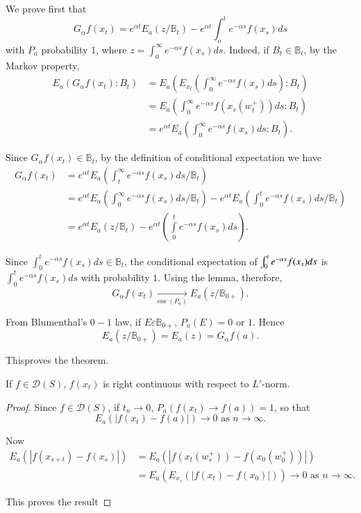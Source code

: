 \begin{pot2}%
We prove first that
$$
G_\alpha f (x_t) = e^{\alpha t} E_a (z /\mathbb{B}_t) -e^{\alpha t}
\int^t_o e^{- \alpha s} f (x_s) ds 
$$
with $P_a$ probability 1, where $z = \int^\infty_0 e^{-\alpha s} f
  (x_s) ds$. Indeed, if $B_t \in \mathbb{B}_t$, by the Markov
  property, 
\begin{align*}
E_a (G_\alpha f (x_t):B_t) & = E_a \left(E_{x_t} \left(\int^\infty_0
e^{-\alpha s} f (x_s) ds\right):B_t\right)\\ 
& = E_a \left(\int^\infty_0 e^{-\alpha s} f (x_s (w^+_t)) ds:B_t\right)\\
& = e^{\alpha t} E_a \left(\int^\infty_0 e^{-\alpha s} f (x_s) ds:B_t\right).
\end{align*}\pageoriginale
  
Since $G_\alpha f (x_t) \in \mathbb{B}_t$, by the definition
of conditional expectation we have 
\begin{align*}
G_\alpha f (x_t) & =e^{\alpha t} E_a \left(\int^\infty_t e^{-\alpha s} f
    (x_s) ds \big/ \mathbb{B}_t\right)\\ 
& = e^{\alpha t} E_a \left(\int^\infty_0 e^{-\alpha s} f (x_s) ds \big/
    \mathbb{B}_t\right) -e^{\alpha t} E_a \left(\int^t_0 e^{-\alpha s}
    f (x_s) ds \big/ \mathbb{B}_t\right)\\ 
    & = e^{\alpha t} E_a (z/\mathbb{B}_{t})-e^{\alpha t}
\left(\int\limits^{t}_{0}e^{-\alpha s}f(x_{s})ds\right).
  \end{align*}
  
Since $\int^t_0 e^{-\alpha s} f (x_s)ds \in \mathbb{B}_t$, the
  conditional expectation of $\int^t_0 e^{-\alpha s}\break f (x_s)ds$ is
  $\int^t_0 e^{-\alpha s} f (x_s)ds$  with probability $1$. Using the
  lemma, therefore, 
$$
G_\alpha f (x_t) \xrightarrow[\text{ess }(P_a)]{} E_a (z \big/
\mathbb{B}_{0+}). 
$$
  
From Blumenthal's $0-1$ law, if $E \varepsilon \mathbb{B}_{0+}$, $P_a
  (E) = 0$ or $1$. Hence  
$$
E_a (z \big/ \mathbb{B}_{0+}) = E_a (z) = G_\alpha f (a).
$$
  
This\pageoriginale proves the theorem.
\end{pot2}

\begin{thm}\label{chap2-sec9-thm3}%
If $f \in \mathscr{D} (S)$, $f (x_t)$ is right continuous with
respect to $L'$-norm. 
\end{thm}

\begin{proof}
Since $f \in \mathscr{D} (S)$, if $t_n \to 0$, $P_a (f (x_t)
  \to f (a)) = 1$, so that  
$$
E_a (|f (x_t) - f (a)|) \to 0 \text{\ as\ } n \to \infty.
$$


Now
\begin{align*}
E_a (|f (x_{s+t}) -f (x_s)|) & = E_a (|f(x_t (w^+_s)) - f (x_0 (w^+_0))|)\\
  & = E_a (E_{x_s} (|f (x_t)-f(x_{0})|))\to 0\text{\ as \ } n\to \infty.
\end{align*}

This proves the result
\end{proof}

